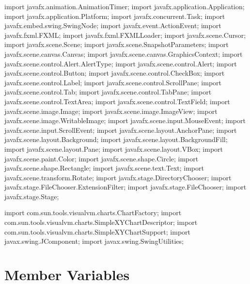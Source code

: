 \nwenddocs{}\plusendmoddef
import javafx.animation.AnimationTimer;
import javafx.application.Application;
import javafx.application.Platform;
import javafx.concurrent.Task;
import javafx.embed.swing.SwingNode;
import javafx.event.ActionEvent;
import javafx.fxml.FXML;
import javafx.fxml.FXMLLoader;
import javafx.scene.Cursor;
import javafx.scene.Scene;
import javafx.scene.SnapshotParameters;
import javafx.scene.canvas.Canvas;
import javafx.scene.canvas.GraphicsContext;
import javafx.scene.control.Alert.AlertType;
import javafx.scene.control.Alert;
import javafx.scene.control.Button;
import javafx.scene.control.CheckBox;
import javafx.scene.control.Label;
import javafx.scene.control.ScrollPane;
import javafx.scene.control.Tab;
import javafx.scene.control.TabPane;
import javafx.scene.control.TextArea;
import javafx.scene.control.TextField;
import javafx.scene.image.Image;
import javafx.scene.image.ImageView;
import javafx.scene.image.WritableImage;
import javafx.scene.input.MouseEvent;
import javafx.scene.input.ScrollEvent;
import javafx.scene.layout.AnchorPane;
import javafx.scene.layout.Background;
import javafx.scene.layout.BackgroundFill;
import javafx.scene.layout.Pane;
import javafx.scene.layout.VBox;
import javafx.scene.paint.Color;
import javafx.scene.shape.Circle;
import javafx.scene.shape.Rectangle;
import javafx.scene.text.Text;
import javafx.scene.transform.Rotate;
import javafx.stage.DirectoryChooser;
import javafx.stage.FileChooser.ExtensionFilter;
import javafx.stage.FileChooser;
import javafx.stage.Stage;
\nwendcode{}\nwdocspar

\nwenddocs{}\plusendmoddef
import com.sun.tools.visualvm.charts.ChartFactory;
import com.sun.tools.visualvm.charts.SimpleXYChartDescriptor;
import com.sun.tools.visualvm.charts.SimpleXYChartSupport;
import javax.swing.JComponent;
import javax.swing.SwingUtilities;
\nwendcode{}\nwdocspar

\section{Member Variables}

